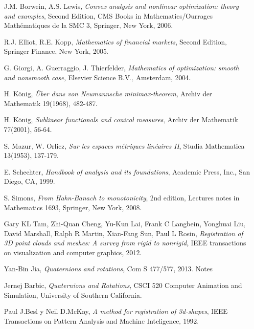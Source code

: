 \documentclass[a4paper,11pt]{book}
\begin{document}
\nocite{*}
% 
% 
\begin{thebibliography}{X}
	 J.M. Borwein, A.S. Lewis, \textsl{Convex analysis and nonlinear optimization: theory and examples}, Second Edition, CMS Books in Mathematics/Ourrages Mathématiques de la SMC 3, Springer, New York, 2006.
	
	 R.J. Elliot, R.E. Kopp, \textsl{Mathematics of financial markets}, Second Edition, Springer Finance, New York, 2005.
	
	 G. Giorgi, A. Guerraggio, J. Thierfelder, \textsl{Mathematics of optimization: smooth and nonsmooth case}, Elsevier Science B.V., Amsterdam, 2004.
		
	 H. König, \textsl{Über dans von Neumannsche minimax-theorem}, Archiv der Mathematik 19(1968), 482-487.
	
	 H. König, \textsl{Sublinear functionals and conical measures}, Archiv der Mathematik 77(2001), 56-64.
	
	 S. Mazur, W. Orlicz, \textsl{Sur les espaces métriques linéaires II}, Studia Mathematica 13(1953), 137-179.

	 E. Schechter,
	\textsl{Handbook of analysis and its foundations}, Academic Press, Inc., San Diego, CA, 1999.
	
	 S. Simons, \textsl{From Hahn-Banach to monotonicity}, 2nd edition, Lectures notes in Mathematics 1693, Springer, New York, 2008.
	
	 Gary KL Tam, Zhi-Quan Cheng, Yu-Kun Lai, Frank C Langbein, Yonghuai Liu, David Marshall, Ralph R Martin, Xian-Fang Sun, Paul L Rosin, \textsl{Registration of 3D point clouds and meshes: A survey from rigid to nonrigid}, IEEE transactions on visualization and computer graphics, 2012.
	
	 Yan-Bin Jia, \textsl{Quaternions and rotations}, Com S 477/577, 2013.
	Notes
	
	 Jernej Barbic, \textsl{Quaternions and Rotations}, CSCI 520 Computer Animation and Simulation, University of Southern California.
	
	 Paul J.Besl y Neil D.McKay, \textsl{A method for registration of 3d-shapes}, IEEE Transactions on Pattern Analysis and Machine Inteligence, 1992.
	

\end{thebibliography}
\end{document}
